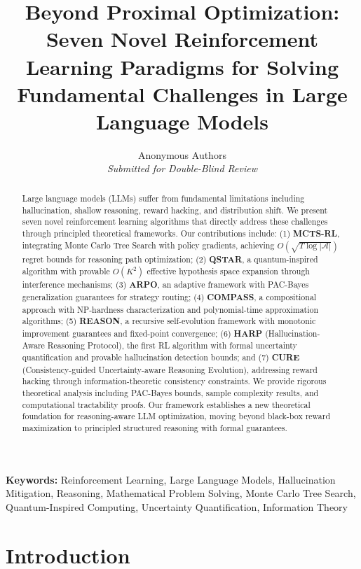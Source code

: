 \documentclass[11pt,a4paper]{article}
\title{\textbf{Beyond Proximal Optimization: Seven Novel Reinforcement Learning Paradigms for Solving Fundamental Challenges in Large Language Models}}
\author{
  Anonymous Authors\\
  \textit{Submitted for Double-Blind Review}
}
\date{}
\newcommand{\calA}{\mathcal{A}}
\begin{document}
\maketitle

\begin{abstract}
Large language models (LLMs) suffer from fundamental limitations including hallucination, shallow reasoning, reward hacking, and distribution shift. We present seven novel reinforcement learning algorithms that directly address these challenges through principled theoretical frameworks. Our contributions include: (1) \textbf{MCTS-RL}, integrating Monte Carlo Tree Search with policy gradients, achieving $O(\sqrt{T \log |\calA|})$ regret bounds for reasoning path optimization; (2) \textbf{QSTAR}, a quantum-inspired algorithm with provable $O(K^2)$ effective hypothesis space expansion through interference mechanisms; (3) \textbf{ARPO}, an adaptive framework with PAC-Bayes generalization guarantees for strategy routing; (4) \textbf{COMPASS}, a compositional approach with NP-hardness characterization and polynomial-time approximation algorithms; (5) \textbf{REASON}, a recursive self-evolution framework with monotonic improvement guarantees and fixed-point convergence; (6) \textbf{HARP} (Hallucination-Aware Reasoning Protocol), the first RL algorithm with formal uncertainty quantification and provable hallucination detection bounds; and (7) \textbf{CURE} (Consistency-guided Uncertainty-aware Reasoning Evolution), addressing reward hacking through information-theoretic consistency constraints. We provide rigorous theoretical analysis including PAC-Bayes bounds, sample complexity results, and computational tractability proofs. Our framework establishes a new theoretical foundation for reasoning-aware LLM optimization, moving beyond black-box reward maximization to principled structured reasoning with formal guarantees.
\end{abstract}

\textbf{Keywords:} Reinforcement Learning, Large Language Models, Hallucination Mitigation, Reasoning, Mathematical Problem Solving, Monte Carlo Tree Search, Quantum-Inspired Computing, Uncertainty Quantification, Information Theory

\section{Introduction}
\end{document}
